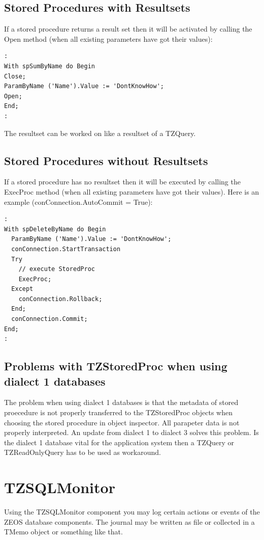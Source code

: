 \documentclass[a4paper,12pt,oneside]{book}
\begin{document}
\subsection{Stored Procedures with Resultsets}

If a stored procedure returns a result set then it will be activated by calling the Open method (when all existing parameters have got their values):

\begin{verbatim}
:
With spSumByName do Begin
Close;
ParamByName ('Name').Value := 'DontKnowHow';
Open;
End;
:
\end{verbatim}

The resultset can be worked on like a resultset of a TZQuery.

\subsection{Stored Procedures without Resultsets}

If a stored procedure has no resultset then it will be executed by calling the ExecProc method (when all existing parameters have got their values).
Here is an example (conConnection.AutoCommit = True):

\begin{verbatim}
:
With spDeleteByName do Begin
  ParamByName ('Name').Value := 'DontKnowHow';
  conConnection.StartTransaction
  Try
    // execute StoredProc
    ExecProc;
  Except
    conConnection.Rollback;
  End;
  conConnection.Commit;
End;
:
\end{verbatim}

\subsection{Problems with TZStoredProc when using dialect 1 databases}
The problem when using dialect 1 databases is that the metadata of stored proecedure is not properly
transferred to the TZStoredProc objects when choosing the stored procedure in object inspector.
All parapeter data is not properly interpreted.
An update from dialect 1 to dialect 3 solves this problem.
Is the dialect 1 database vital for the application system then a TZQuery or TZReadOnlyQuery has to be used as workaround.

\section{TZSQLMonitor}
Using the TZSQLMonitor component you may log certain actions or events of the ZEOS database
components. The journal may be written as file or collected in a TMemo object or something like that.
\end{document}
